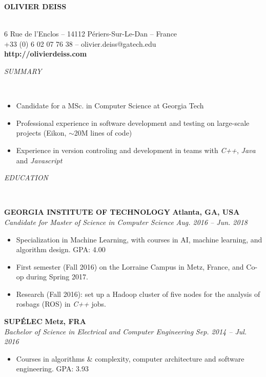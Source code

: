 \documentclass[a4paper, 12pt]{article}
\newcommand{\marginline}{-0.3cm}
\newcommand{\margincontent}{-0.6cm}
\newcommand{\marginsummary}{-0.3cm}
\newcommand{\marginbeforesection}{0.3cm}
\newcommand{\marginaftersummary}{0.2cm}
\newcommand{\linewidthperso}{0.02cm}
\newcommand{\stylesection}[1]{
  \vspace{\marginbeforesection}
  \begin{normalsize}\textit{#1}\end{normalsize}
  \vspace{\marginline}\\
  \noindent\makebox[\linewidth]{\rule{\textwidth}{\linewidthperso}}

}
\newcommand{\styletitle}[1]{\textbf{#1}}
\newcommand{\styledesc}[1]{\textit{#1}}
\newcommand{\styleloc}[1]{\textbf{#1}}
\newcommand{\styledates}[1]{\textit{#1}}
\begin{document}
\begin{footnotesize}

\begin{center}
  \begin{small}\textbf{OLIVIER DEISS}\end{small}\\
  6 Rue de l'Enclos -- 14112 P\'eriers-Sur-Le-Dan -- France\\
  +33 (0) 6 02 07 76 38 -- olivier.deiss@gatech.edu\\
  \textbf{http://olivierdeiss.com}
\end{center}

\stylesection{SUMMARY}

\vspace{\marginsummary}
\begin{itemize}
  \item Candidate for a MSc. in Computer Science at Georgia Tech
  \item Professional experience in software development and testing on large-scale projects (Eikon, $\sim$20M lines of code)
  \item Experience in version controling and development in teams with \textit{C++}, \textit{Java} and \textit{Javascript}
\end{itemize}
\vspace{\marginaftersummary}

\stylesection{EDUCATION}

\styletitle{GEORGIA INSTITUTE OF TECHNOLOGY} \hfill \styleloc{Atlanta, GA, USA}\\
\styledesc{Candidate for Master of Science in Computer Science} \hfill \styledates{Aug. 2016 -- Jun. 2018}\\
\vspace{\margincontent}
\begin{itemize}
  \item Specialization in Machine Learning, with courses in AI, machine learning, and algorithm design. \hfill GPA: 4.00
  \item First semester (Fall 2016) on the Lorraine Campus in Metz, France, and Co-op during Spring 2017.
  \item Research (Fall 2016): set up a Hadoop cluster of five nodes for the analysis of rosbags (ROS) in \textit{C++} jobs.
\end{itemize}

\styletitle{SUP\'ELEC} \hfill \styleloc{Metz, FRA}\\
\styledesc{Bachelor of Science in Electrical and Computer Engineering} \hfill \styledates{Sep. 2014 -- Jul. 2016}\\
\vspace{\margincontent}
\begin{itemize}
  \item Courses in algorithms \& complexity, computer architecture and software engineering. \hfill GPA: 3.93
\end{itemize}


\end{footnotesize}
\end{document}
